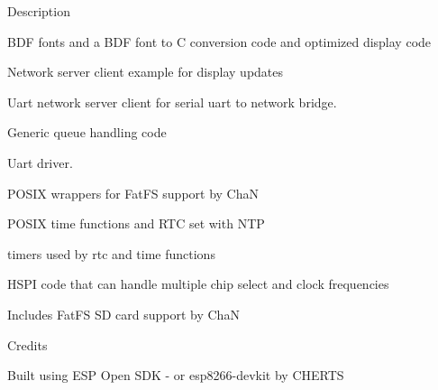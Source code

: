 \begin{DoxyParagraph}{Description}
\begin{DoxyItemize}
\begin{DoxyItemize}
\item B\-D\-F fonts and a B\-D\-F font to C conversion code and optimized display code
\item Network server client example for display updates
\item Uart network server client for serial uart to network bridge.
\item Generic queue handling code
\item Uart driver.
\item P\-O\-S\-I\-X wrappers for Fat\-F\-S support by Cha\-N
\item P\-O\-S\-I\-X time functions and R\-T\-C set with N\-T\-P
\item timers used by rtc and time functions
\item H\-S\-P\-I code that can handle multiple chip select and clock frequencies
\end{DoxyItemize}
\item Includes Fat\-F\-S S\-D card support by Cha\-N
\end{DoxyItemize}
\end{DoxyParagraph}
\begin{DoxyParagraph}{Credits}

\begin{DoxyItemize}
\item Built using E\-S\-P Open S\-D\-K -\/ or esp8266-\/devkit by C\-H\-E\-R\-T\-S 
\end{DoxyItemize}
\end{DoxyParagraph}
